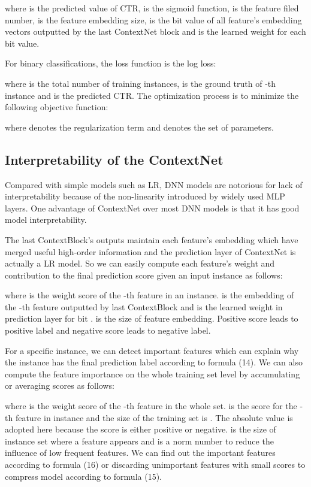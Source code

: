 \documentclass[sigconf]{acmart}
\begin{document}
\noindent where  is the predicted value of CTR,  is the sigmoid function,  is the feature filed number,  is the feature embedding size,  is the bit value of all feature's embedding vectors outputted by the last ContextNet block and  is the learned weight for each bit value.


For binary classifications, the loss function is the log loss:

where  is the total number of training instances,  is the ground truth of -th instance and  is the predicted CTR. The optimization process is to minimize the following objective function:

where  denotes the regularization term and  denotes the set of parameters.

\subsection{Interpretability of  the ContextNet}
Compared with simple models such as LR\cite{10.1145/2487575.2488200}, DNN models are notorious for lack of interpretability because of the non-linearity introduced by widely used MLP layers. One advantage of ContextNet over most DNN models is that it has good model interpretability.


The last ContextBlock's outputs maintain each feature’s embedding which have merged useful high-order information and the prediction layer of ContextNet is actually a LR model. So we can easily compute each feature's weight and contribution to the final prediction score given an input instance as follows:

where  is the weight score of the -th feature in an instance.  is the embedding of the -th feature outputted by last ContextBlock and  is the learned weight in prediction layer for bit .  is the size of feature embedding. Positive score leads to positive label and negative score leads to negative label.


For a specific instance, we can detect important features which can explain why the instance has the final prediction label according to formula (14). We can also compute the feature importance on the whole training set level by accumulating or averaging scores as follows:




where  is the weight score of the  -th feature in the whole set.  is the score for the -th feature in instance  and the size of the training set is . The absolute value is adopted here because the score is either positive or negative.  is the size of instance set where a feature appears and  is a norm number to reduce the influence of low frequent features. We can find out the important features according to formula (16) or discarding unimportant features with small scores  to compress model according to formula (15).
\end{document}
